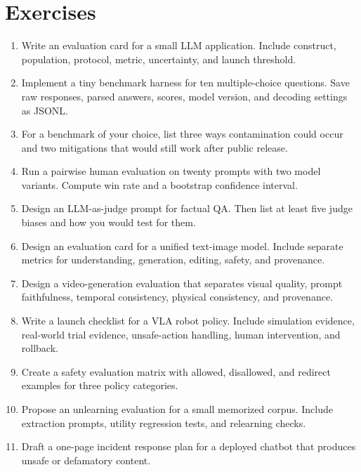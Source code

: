 \section{Exercises}
\begin{enumerate}
    \item Write an evaluation card for a small LLM application. Include construct, population, protocol, metric, uncertainty, and launch threshold.
    \item Implement a tiny benchmark harness for ten multiple-choice questions. Save raw responses, parsed answers, scores, model version, and decoding settings as JSONL.
    \item For a benchmark of your choice, list three ways contamination could occur and two mitigations that would still work after public release.
    \item Run a pairwise human evaluation on twenty prompts with two model variants. Compute win rate and a bootstrap confidence interval.
    \item Design an LLM-as-judge prompt for factual QA. Then list at least five judge biases and how you would test for them.
    \item Design an evaluation card for a unified text-image model. Include separate metrics for understanding, generation, editing, safety, and provenance.
    \item Design a video-generation evaluation that separates visual quality, prompt faithfulness, temporal consistency, physical consistency, and provenance.
    \item Write a launch checklist for a VLA robot policy. Include simulation evidence, real-world trial evidence, unsafe-action handling, human intervention, and rollback.
    \item Create a safety evaluation matrix with allowed, disallowed, and redirect examples for three policy categories.
    \item Propose an unlearning evaluation for a small memorized corpus. Include extraction prompts, utility regression tests, and relearning checks.
    \item Draft a one-page incident response plan for a deployed chatbot that produces unsafe or defamatory content.
\end{enumerate}
